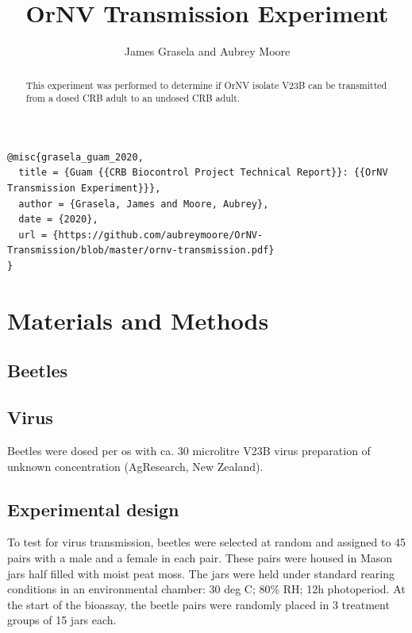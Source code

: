 \documentclass[11pt,letterpaper]{scrartcl}
\begin{document}
\titlehead{\centering Guam Coconut Rhinoceros Beetle Biocontrol Project Technical Report}
\title{OrNV Transmission Experiment}
\author{James Grasela and Aubrey Moore}
\maketitle

\begin{abstract}
	This experiment was performed to determine if OrNV isolate V23B can be transmitted from a dosed CRB adult to an undosed CRB 
	adult.
\end{abstract}

\begin{scriptsize}
\begin{verbatim}
@misc{grasela_guam_2020,
  title = {Guam {{CRB Biocontrol Project Technical Report}}: {{OrNV Transmission Experiment}}},
  author = {Grasela, James and Moore, Aubrey},
  date = {2020},
  url = {https://github.com/aubreymoore/OrNV-Transmission/blob/master/ornv-transmission.pdf}
}
\end{verbatim}
\end{scriptsize}

\newpage

\section{Materials and Methods}

\subsection{Beetles}

\subsection{Virus}

Beetles were dosed per os with ca. 30 microlitre V23B virus preparation of unknown concentration (AgResearch, New Zealand).

\subsection{Experimental design}

To test for virus transmission, beetles were selected at random and assigned to 45 pairs with a male and a female 
in each pair. These pairs were housed in Mason jars half filled with moist peat moss. The jars were held under 
standard rearing conditions in an environmental chamber: 30 deg C; 80\% RH; 12h photoperiod. At the start of the 
bioassay, the beetle pairs were randomly placed in 3 treatment groups of 15 jars each. 
\end{document}
